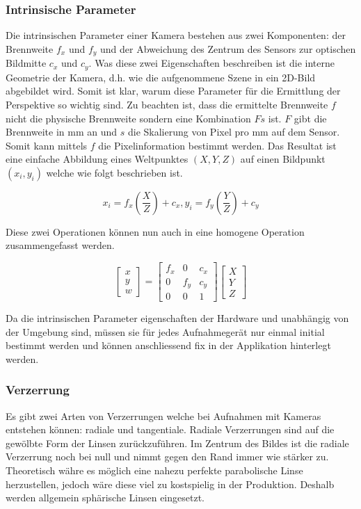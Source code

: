 \documentclass[main.tex]{subfiles}
\begin{document}
\subsubsection{Intrinsische Parameter}
Die intrinsischen Parameter einer Kamera bestehen aus zwei Komponenten: der Brennweite $f_x$ und $f_y$ und der Abweichung des Zentrum des Sensors zur optischen Bildmitte $c_x$ und $c_y$. Was diese zwei Eigenschaften beschreiben ist die interne Geometrie der Kamera, d.h. wie die aufgenommene Szene in ein 2D-Bild abgebildet wird. Somit ist klar, warum diese Parameter für die Ermittlung der Perspektive so wichtig sind. Zu beachten ist, dass die ermittelte Brennweite $f$ nicht die physische Brennweite sondern eine Kombination $Fs$ ist. $F$ gibt die Brennweite in mm an und $s$ die Skalierung von Pixel pro mm auf dem Sensor. Somit kann mittels $f$ die Pixelinformation bestimmt werden. Das Resultat ist eine einfache Abbildung eines Weltpunktes $(X, Y, Z)$ auf einen Bildpunkt $(x_i, y_i)$ welche wie folgt beschrieben ist.

\begin{equation}
x_i = f_x (\frac{X}{Z}) + c_x,   y_i = f_y (\frac{Y}{Z}) + c_y
\end{equation}

Diese zwei Operationen können nun auch in eine homogene Operation zusammengefasst werden.

\begin{equation}
\begin{bmatrix}
x \\ y \\ w
\end{bmatrix} 
=
\begin{bmatrix}
f_x & 0 & c_x \\
0 & f_y & c_y \\
0 & 0 & 1
\end{bmatrix} 
\begin{bmatrix}
X \\ Y \\ Z
\end{bmatrix} 
\end{equation}

Da die intrinsischen Parameter eigenschaften der Hardware und unabhängig von der Umgebung sind, müssen sie für jedes Aufnahmegerät nur einmal initial bestimmt werden und können anschliessend fix in der Applikation hinterlegt werden.

\subsubsection{Verzerrung}
Es gibt zwei Arten von Verzerrungen welche bei Aufnahmen mit Kameras entstehen können: radiale und tangentiale. Radiale Verzerrungen sind auf die gewölbte Form der Linsen zurückzuführen. Im Zentrum des Bildes ist die radiale Verzerrung noch bei null und nimmt gegen den Rand immer wie stärker zu. Theoretisch währe es möglich eine nahezu perfekte parabolische Linse herzustellen, jedoch wäre diese viel zu kostspielig in der Produktion. Deshalb werden allgemein sphärische Linsen eingesetzt.
\end{document}
